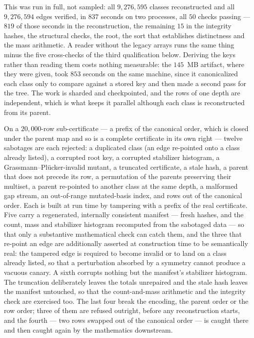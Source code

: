 \documentclass[11pt]{amsart}
\theoremstyle{remark}
\begin{document}
This was run in full, not sampled: all $9{,}276{,}595$ classes
reconstructed and all $9{,}276{,}594$ edges verified, in $837$ seconds on
two processes, all $50$ checks passing --- $819$ of those seconds in the
reconstruction, the remaining $15$ in the integrity hashes, the structural
checks, the root, the sort that establishes distinctness and the mass
arithmetic. A reader without the legacy arrays runs the same thing minus
the five cross-checks of the third qualification below. Deriving the keys
rather than reading them costs nothing measurable: the $145$~MB artifact,
where they were given, took $853$ seconds on the same machine, since it
canonicalized each class only to compare against a stored key and then made
a second pass for the tree. The work is sharded and checkpointed, and the
rows of one depth are independent, which is what keeps it parallel although
each class is reconstructed from its parent.

On a $20{,}000$-row sub-certificate --- a prefix of the canonical order,
which is closed under the parent map and so is a complete certificate in
its own right --- twelve sabotages are each rejected: a duplicated class
(an edge re-pointed onto a class already listed), a corrupted root key, a
corrupted stabilizer histogram, a Grassmann--Pl\"ucker-invalid mutant, a
truncated certificate, a stale hash, a parent that does not precede its
row, a permutation of the parents preserving their multiset, a parent
re-pointed to another class at the same depth, a malformed gap stream, an
out-of-range mutated-basis index, and rows out of the canonical order.
Each is built at run time by tampering with a prefix of the real
certificate. Five carry a regenerated, internally consistent manifest ---
fresh hashes, and the count, mass and stabilizer histogram recomputed from
the sabotaged data --- so that only a substantive mathematical check can
catch them, and the three that re-point an edge are additionally asserted
at construction time to be semantically real: the tampered edge is
required to become invalid or to land on a class already listed, so that a
perturbation absorbed by a symmetry cannot produce a vacuous canary. A
sixth corrupts nothing but the manifest's stabilizer histogram. The
truncation deliberately leaves the totals unrepaired and the stale hash
leaves the manifest untouched, so that the count-and-mass arithmetic and
the integrity check are exercised too. The last four break the encoding,
the parent order or the row order; three of them are refused outright,
before any reconstruction starts, and the fourth --- two rows swapped out
of the canonical order --- is caught there and then caught again by the
mathematics downstream.
\end{document}

